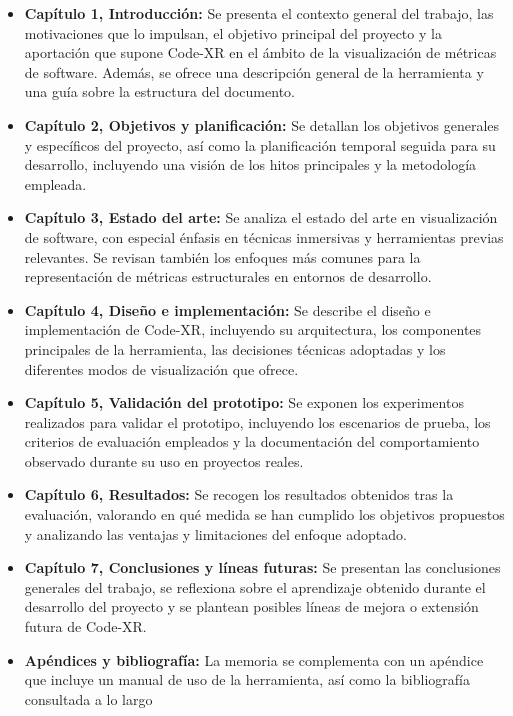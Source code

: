 \documentclass[a4paper, 12pt]{book}
\begin{document}
\begin{itemize}
    \item \textbf{Capítulo 1, Introducción:} Se presenta el contexto general del trabajo, las motivaciones que lo impulsan, el objetivo principal del proyecto y la aportación que supone Code-XR en el ámbito de la visualización de métricas de software. Además, se ofrece una descripción general de la herramienta y una guía sobre la estructura del documento.
    \item \textbf{Capítulo 2, Objetivos y planificación:} Se detallan los objetivos generales y específicos del proyecto, así como la planificación temporal seguida para su desarrollo, incluyendo una visión de los hitos principales y la metodología empleada.
    \item \textbf{Capítulo 3, Estado del arte:} Se analiza el estado del arte en visualización de software, con especial énfasis en técnicas inmersivas y herramientas previas relevantes. Se revisan también los enfoques más comunes para la representación de métricas estructurales en entornos de desarrollo.
    \item \textbf{Capítulo 4, Diseño e implementación:} Se describe el diseño e implementación de Code-XR, incluyendo su arquitectura, los componentes principales de la herramienta, las decisiones técnicas adoptadas y los diferentes modos de visualización que ofrece.
    \item \textbf{Capítulo 5, Validación del prototipo:} Se exponen los experimentos realizados para validar el prototipo, incluyendo los escenarios de prueba, los criterios de evaluación empleados y la documentación del comportamiento observado durante su uso en proyectos reales.
    \item \textbf{Capítulo 6, Resultados:} Se recogen los resultados obtenidos tras la evaluación, valorando en qué medida se han cumplido los objetivos propuestos y analizando las ventajas y limitaciones del enfoque adoptado.
    \item \textbf{Capítulo 7, Conclusiones y líneas futuras:} Se presentan las conclusiones generales del trabajo, se reflexiona sobre el aprendizaje obtenido durante el desarrollo del proyecto y se plantean posibles líneas de mejora o extensión futura de Code-XR.
    \item \textbf{Apéndices y bibliografía:} La memoria se complementa con un apéndice que incluye un manual de uso de la herramienta, así como la bibliografía consultada a lo largo
\end{itemize}
\end{document}

